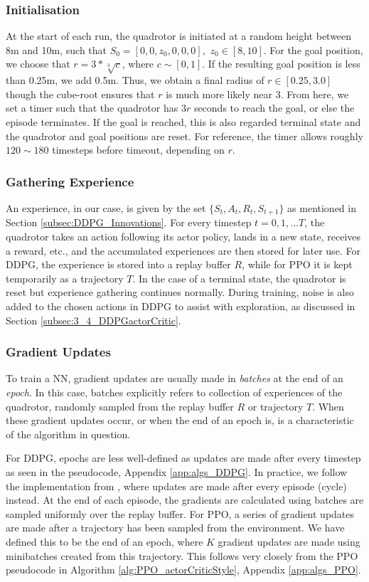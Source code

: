 \subsubsection{Initialisation}
At the start of each run, the quadrotor is initiated at a random height between 8m and 10m, such that $S_0 = [0,0,z_0,0,0,0], \,\, z_0 \in [8, 10]$. For the goal position, we choose that $r = 3 * \sqrt[3]{c}$, where $c \sim [0,1]$. If the resulting goal position is less than 0.25m, we add 0.5m. Thus, we obtain a final radius of $r \in [0.25, 3.0]$ though the cube-root ensures that $r$ is much more likely near $3$.
From here, we set a timer such that the quadrotor has $3r$ seconds to reach the goal, or else the episode terminates. If the goal is reached, this is also regarded terminal state and the quadrotor and goal positions are reset. For reference, the timer allows roughly $120 \sim 180$ timesteps before timeout, depending on $r$.

\subsubsection{Gathering Experience}
An experience, in our case, is given by the set $\{S_t, A_t, R_t, S_{t+1} \}$ as mentioned in Section \ref{subsec:DDPG_Innovations}. For every timestep $t = 0,1,...T$, the quadrotor takes an action following its actor policy, lands in a new state, receives a reward, etc., and the accumulated experiences are then stored for later use. For DDPG, the experience is stored into a replay buffer $R$, while for PPO it is kept temporarily as a trajectory $T$. In the case of a terminal state, the quadrotor is reset but experience gathering continues normally. During training, noise is also added to the chosen actions in DDPG to assist with exploration, as discussed in Section \ref{subsec:3_4_DDPGactorCritic}.

\subsubsection{Gradient Updates}
To train a NN, gradient updates are usually made in \textit{batches} at the end of an \textit{epoch}. In this case, batches explicitly refers to collection of experiences of the quadrotor, randomly sampled from the replay buffer $R$ or trajectory $T$. 
When these gradient updates occur, or when the end of an epoch is, is a characteristic of the algorithm in question. 

For DDPG, epochs are less well-defined as updates are made after every timestep as seen in the pseudocode, Appendix \ref{app:algs_DDPG}. In practice, we follow the implementation from \cite{baselines}, where updates are made after every episode (cycle) instead. At the end of each episode, the gradients are calculated using batches are sampled uniformly over the replay buffer.
For PPO, a series of gradient updates are made after a trajectory has been sampled from the environment. We have defined this to be the end of an epoch, where $K$ gradient updates are made using minibatches created from this trajectory. This follows very closely from the PPO pseudocode in Algorithm \ref{alg:PPO_actorCriticStyle}, Appendix \ref{app:algs_PPO}.


